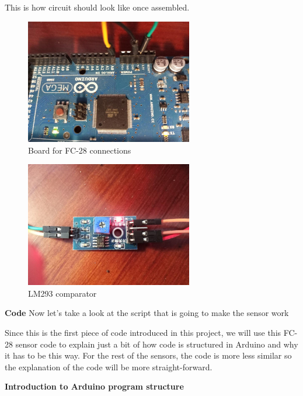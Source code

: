 \vspace{5mm}
This is how circuit should look like once assembled.
	\begin{figure}[H]
		\centering
		\includegraphics[width=0.65\textwidth]{fig/fc28-circuit1.jpg}
		\caption{Board for FC-28 connections}
	\end{figure}
	\hfill
	\begin{figure}[H]
		\centering
		\includegraphics[width=0.65\textwidth]{fig/fc28-circuit2.jpg}
		\caption{LM293 comparator}
	\end{figure}

\vspace{7mm}
\textbf{Code}
Now let's take a look at the script that is going to make the sensor work



\vspace{7mm}
Since this is the first piece of code introduced in this project, we will use this FC-28 sensor code to explain just a bit of how code is structured in Arduino and why it has to be this way. For the rest of the sensors, the code is more less similar so the explanation of the code will be more straight-forward.

\vspace{7mm}
\textbf{Introduction to Arduino program structure}

